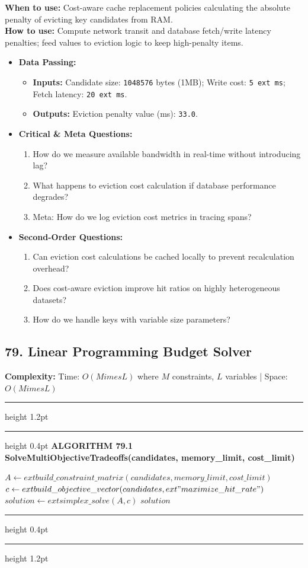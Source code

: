 \documentclass[11pt,a4paper]{article}
\newenvironment{textbookalgo}[2]{%
  \par\addvspace{1.2em}\noindent
  \hrule height 1.2pt
  \vspace{1.5pt}
  \hrule height 0.4pt
  \vspace{5pt}
  {\noindent\large\bfseries\sffamily ALGORITHM #1 \quad #2}
  \par\vspace{5pt}
  \RestyleAlgo{plain}
}{%
  \par\vspace{4pt}
  \hrule height 0.4pt
  \vspace{1.5pt}
  \hrule height 1.2pt
  \par\addvspace{1.2em}
}
\theoremstyle{definition}
\begin{document}
\noindent
\textbf{When to use:} Cost-aware cache replacement policies calculating the absolute penalty of evicting key candidates from RAM.\\
\textbf{How to use:} Compute network transit and database fetch/write latency penalties; feed values to eviction logic to keep high-penalty items.
\begin{itemize}[leftmargin=*]
  \item[] \textbf{Data Passing:}
    \begin{itemize}
      \item \textbf{Inputs:} Candidate size: \texttt{1048576} bytes (1MB); Write cost: \texttt{5	ext{ ms}}; Fetch latency: \texttt{20	ext{ ms}}.
      \item \textbf{Outputs:} Eviction penalty value (ms): \texttt{33.0}.
    \end{itemize}
  \item[] \textbf{Critical \& Meta Questions:}
  \begin{enumerate}
    \item How do we measure available bandwidth in real-time without introducing lag?
    \item What happens to eviction cost calculation if database performance degrades?
    \item Meta: How do we log eviction cost metrics in tracing spans?
  \end{enumerate}
  \item[] \textbf{Second-Order Questions:}
  \begin{enumerate}
    \item Can eviction cost calculations be cached locally to prevent recalculation overhead?
    \item Does cost-aware eviction improve hit ratios on highly heterogeneous datasets?
    \item How do we handle keys with variable size parameters?
  \end{enumerate}
\end{itemize}
\medskip

\clearpage
\subsection{79. Linear Programming Budget Solver}


\noindent
\textbf{Complexity:} Time: $O(M 	imes L)$ where $M$ constraints, $L$ variables | Space: $O(M 	imes L)$
\smallskip

\begin{textbookalgo}{79.1}{SolveMultiObjectiveTradeoffs(candidates, memory\_limit, cost\_limit)}
\begin{algorithm}[H]
$A \leftarrow 	ext{build\_constraint\_matrix}(candidates, memory\_limit, cost\_limit)$\;
$c \leftarrow 	ext{build\_objective\_vector}(candidates, 	ext{"maximize\_hit\_rate"})$\;
$solution \leftarrow 	ext{simplex\_solve}(A, c)$\;
\Return $solution$\;
\end{algorithm}
\end{textbookalgo}
\end{document}
